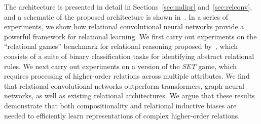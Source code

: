 The architecture is presented in detail in Sections~\ref{sec:mdipr} and~\ref{sec:relconv}, and a schematic of the proposed architecture is shown in~. In a series of experiments, we show how relational convolutional neural networks provide a powerful framework
for relational learning. We first carry out experiments on the ``relational games'' benchmark for relational reasoning proposed by~\citep{shanahanExplicitlyRelationalNeural}, which consists of a suite of binary classification tasks for identifying abstract relational rules. 
We next carry out experiments on a version of the \textit{SET} game, which requires processing of higher-order relations across multiple attributes. We find that relational convolutional networks outperform transformers, graph neural networks, as well as existing relational architectures. We argue that these results demonstrate that both compositionality and relational inductive biases are needed to efficiently learn representations of complex higher-order relations.

